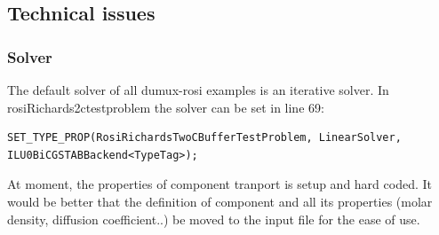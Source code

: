 \subsection*{Technical issues}

\subsubsection*{Solver}

The default solver of all dumux-rosi examples is an iterative solver.
In rosiRichards2ctestproblem the solver can be set in line 69: 
\begin{lstlisting}
SET_TYPE_PROP(RosiRichardsTwoCBufferTestProblem, LinearSolver, ILU0BiCGSTABBackend<TypeTag>);
\end{lstlisting}

At moment, the properties of component tranport is setup and hard
coded. It would be better that the definition of component and all
its properties (molar density, diffusion coefficient..) be moved to
the input file for the ease of use.

